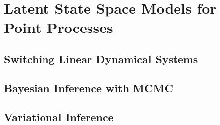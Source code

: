  
\chapter{Latent State Space Models for Point Processes}

\section{Switching Linear Dynamical Systems}

\section{Bayesian Inference with MCMC}

\section{Variational Inference}

